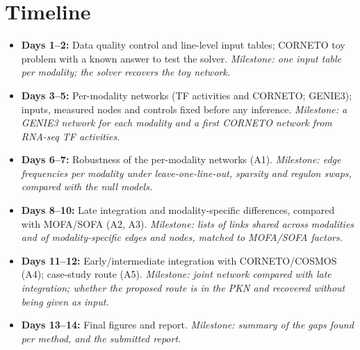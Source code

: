 \documentclass[11pt, a4paper]{article}
\begin{document}
\newpage

\section*{Timeline}
\begin{itemize}[noitemsep]
    \item \textbf{Days 1--2:} Data quality control and line-level input tables; CORNETO toy problem with a known answer to test the solver. \textit{Milestone: one input table per modality; the solver recovers the toy network.}
    \item \textbf{Days 3--5:} Per-modality networks (TF activities and CORNETO; GENIE3); inputs, measured nodes and controls fixed before any inference. \textit{Milestone: a GENIE3 network for each modality and a first CORNETO network from RNA-seq TF activities.}
    \item \textbf{Days 6--7:} Robustness of the per-modality networks (A1). \textit{Milestone: edge frequencies per modality under leave-one-line-out, sparsity and regulon swaps, compared with the null models.}
    \item \textbf{Days 8--10:} Late integration and modality-specific differences, compared with MOFA/SOFA (A2, A3). \textit{Milestone: lists of links shared across modalities and of modality-specific edges and nodes, matched to MOFA/SOFA factors.}
    \item \textbf{Days 11--12:} Early/intermediate integration with CORNETO/COSMOS (A4); case-study route (A5). \textit{Milestone: joint network compared with late integration; whether the proposed route is in the PKN and recovered without being given as input.}
    \item \textbf{Days 13--14:} Final figures and report. \textit{Milestone: summary of the gaps found per method, and the submitted report.}
\end{itemize}


\end{document}
